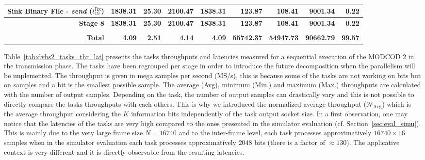 \begin{table}[htp]
{{\begin{tabular}{r | r r r r  | r r r | r}
    \rowcolor{Paired-7!15}
                 Sink Binary File -          \emph{send} ($t^\text{Rx}_{19}$) &         1838.31  &            25.30  &          2100.47  &                                1838.31  &           123.87  &           108.41  &          9001.34  &          0.22  \\ \hline
                                                             \textbf{Stage 8} & \textbf{1838.31} &    \textbf{25.30} &  \textbf{2100.47} &                        \textbf{1838.31} &   \textbf{123.87} &   \textbf{108.41} &  \textbf{9001.34} &  \textbf{0.22} \\ %
                                                                              &                  &                   &                   &                                         &                   &                   &                   &                \\ \hline \hline
                                                               \textbf{Total} &    \textbf{4.09} &     \textbf{2.51} &     \textbf{4.14} &                           \textbf{4.09} & \textbf{55742.37} & \textbf{54947.73} & \textbf{90662.79} & \textbf{99.57} \\ %
  \end{tabular}
  }}
\end{table}

Table~\ref{tab:dvbs2_tasks_thr_lat} presents the tasks throughputs and latencies
measured for a sequential execution of the MODCOD 2 in the transmission phase.
The tasks have been regrouped per stage in order to introduce the future
decomposition when the parallelism will be implemented. The throughput is given
in mega samples per second (MS/s), this is because some of the tasks are not
working on bits but on samples and a bit is the smallest possible sample. The
average (Avg), minimum (Min.) and maximum (Max.) throughputs are calculated with
the number of output samples. Depending on the task, the number of output
samples can drastically vary and this is not possible to directly compare the
tasks throughputs with each others. This is why we introduced the normalized
average throughput ($\mathcal{N}_\text{Avg}$) which is the average throughput
considering the $K$ information bits independently of the task output socket
size. In a first observation, one may notice that the latencies of the tasks are
very high compared to the ones presented in the simulator evaluation (cf.
Section~\ref{sec:eval_simu}). This is mainly due to the very large frame size
$N = 16740$ and to the inter-frame level, each task processes approximatively
$16740 \times 16$ samples when in the simulator evaluation each task processes
approximatively $2048$ bits (there is a factor of $\approx 130$). The
applicative context is very different and it is directly observable from the
resulting latencies.

